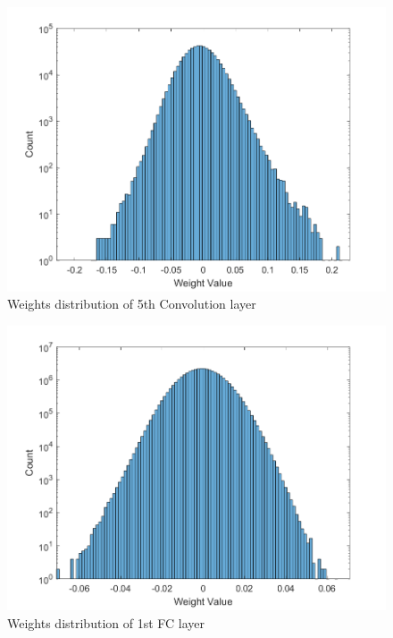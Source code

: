 \begin{figure} [H]
	\centering
	\includegraphics[scale=0.9]{Images/Weights-distributions/original/weight-distribution-conv5.png}
	\decoRule
	\caption[Weights distribution of 5th Convolution layer]{Weights distribution of 5th Convolution layer}
	\label{fig:weight-distribution-conv5}
\end{figure}

\begin{figure} [H]
	\centering
	\includegraphics[scale=0.9]{Images/Weights-distributions/original/weight-distribution-FC1.png}
	\decoRule
	\caption[Weights distribution of 1st FC layer]{Weights distribution of 1st FC layer}
	\label{fig:weight-distribution-FC1}
\end{figure}

